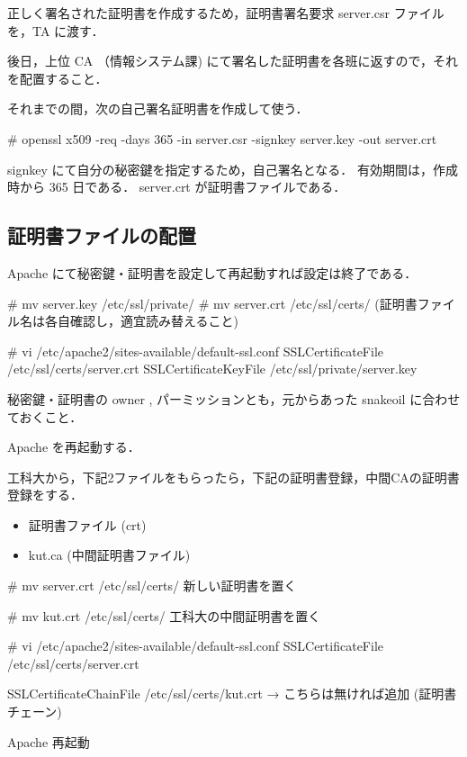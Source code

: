 正しく署名された証明書を作成するため，証明書署名要求 server.csr ファイルを，TA に渡す．

後日，上位 CA （情報システム課) にて署名した証明書を各班に返すので，それを配置すること．

それまでの間，次の自己署名証明書を作成して使う．

\begin{cli}
# openssl x509 -req -days 365 -in server.csr -signkey server.key -out server.crt

signkey にて自分の秘密鍵を指定するため，自己署名となる．
有効期間は，作成時から 365 日である．
server.crt が証明書ファイルである．
\end{cli}

\subsection{証明書ファイルの配置}

Apache にて秘密鍵・証明書を設定して再起動すれば設定は終了である．

\begin{cli}
# mv server.key /etc/ssl/private/
# mv server.crt /etc/ssl/certs/
(証明書ファイル名は各自確認し，適宜読み替えること)

# vi /etc/apache2/sites-available/default-ssl.conf
SSLCertificateFile      /etc/ssl/certs/server.crt
SSLCertificateKeyFile /etc/ssl/private/server.key

秘密鍵・証明書の owner , パーミッションとも，元からあった snakeoil に合わせておくこと．

Apache を再起動する．
\end{cli}

工科大から，下記2ファイルをもらったら，下記の証明書登録，中間CAの証明書登録をする．

\begin{itemize}
    \item 証明書ファイル (crt)
    \item kut.ca (中間証明書ファイル)
\end{itemize}

\begin{cli}
# mv server.crt /etc/ssl/certs/
 新しい証明書を置く

# mv kut.crt /etc/ssl/certs/
 工科大の中間証明書を置く

# vi /etc/apache2/sites-available/default-ssl.conf
SSLCertificateFile      /etc/ssl/certs/server.crt

SSLCertificateChainFile /etc/ssl/certs/kut.crt
→ こちらは無ければ追加 (証明書チェーン)

Apache 再起動

\end{cli}

